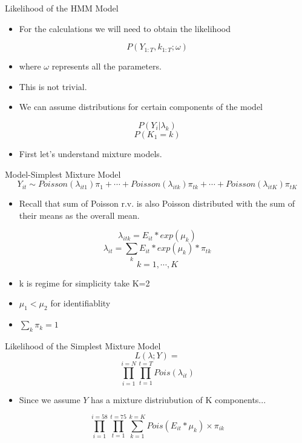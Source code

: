 \documentclass[aspectratio=169,xcolor=dvipsnames]{beamer}
\newcommand{\?}{}
\begin{document}
\begin{frame}{Likelihood of the HMM Model}
\begin{itemize}
\item For the calculations we will need to obtain the likelihood     
\end{itemize}
\[P(Y_{1:T},k_{1:T};\omega)\]
\begin{itemize}
\item where $\omega$ represents all the parameters.
\item This is not trivial. 
\item We can assume distributions for certain components of the model
\end{itemize}
\[P(Y_{i}|\lambda_{k})\]
\[P(K_{1}=k)\]
\begin{itemize}
\item First let's understand mixture models.
\end{itemize}
\end{frame}
\begin{frame}{Model-Simplest Mixture Model}
\[Y_{it} \sim Poisson(\lambda_{it1})\pi_1+\cdots+ Poisson(\lambda_{itk})\pi_{tk}+\cdots + Poisson(\lambda_{itK})\pi_{tK}\]
\begin{itemize}
\item Recall that sum of Poisson r.v. is also Poisson distributed with the sum of their means as the overall mean. 
\end{itemize}
\[\lambda_{itk} = E_{it}*exp(\mu_{k})\]
\[\lambda_{it}=\sum_k E_{it}*exp(\mu_{k})*\pi_{tk}\]
\[k=1,\cdots,K\]
\begin{itemize}
    \item k is regime for simplicity take K=2
    \item $\mu_{1} < \mu_{2}$ for identifiablity
    \item $\sum_{k} \pi_{k} =1$

\end{itemize} 
\end{frame}
\begin{frame}{Likelihood of the Simplest Mixture Model}
\[L(\lambda;Y) = \]
\[\prod_{i=1}^{i=N}\prod_{t=1}^{t=T}Pois(\lambda_{it}) \]
\begin{itemize}
\item Since we assume $Y$ has a mixture distriubution of K components...
\end{itemize}
\[\prod_{i=1}^{i=58}\prod_{t=1}^{t=75}\sum_{k=1}^{k=K}Pois(E_{it}*\mu_k) \times \pi_{ik}\]
\end{frame}
\end{document}
